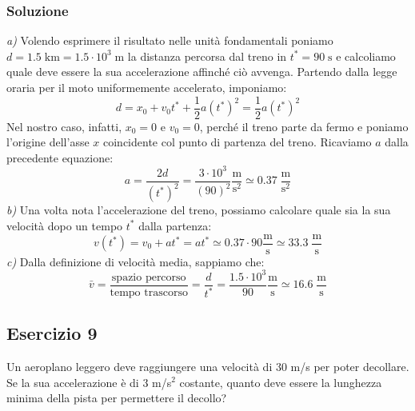 \documentclass[12pt,a4paper]{book}
\begin{document}
\subsubsection*{Soluzione}
\emph{a)} Volendo esprimere il risultato nelle unità fondamentali poniamo $d=1.5 \; \text{km} = 1.5 \cdot 10^3 \; \text{m}$ la distanza percorsa dal treno in $t^*=90 \; \text{s}$ e calcoliamo quale deve essere la sua accelerazione affinché ciò avvenga. Partendo dalla legge oraria per il moto uniformemente accelerato, imponiamo:\\
\begin{equation*}
d=x_0+v_0 t^* + \frac{1}{2}a (t^*)^2 = \frac{1}{2} a (t^*)^2
\end{equation*}
Nel nostro caso, infatti, $x_0 =0$ e $v_0 = 0$, perché il treno parte da fermo e poniamo l'origine dell'asse $x$ coincidente col punto di partenza del treno. Ricaviamo $a$ dalla precedente equazione:\\
\begin{equation*}
a= \frac{2d}{(t^*)^2}= \frac{3 \cdot 10^3}{(90)^2} \frac{\text{m}}{\text{s}^2}\simeq 0.37 \; \frac{\text{m}}{\text{s}^2}
\end{equation*}
\emph{b)} Una volta nota l'accelerazione del treno, possiamo calcolare quale sia la sua velocità dopo un tempo $t^*$ dalla partenza:\\
\begin{equation*}
v(t^*) = v_0 + a t^* = a t^* \simeq 0.37\cdot 90 \frac{\text{m}}{\text{s}} \simeq 33.3 \; \frac{\text{m}}{\text{s}}
\end{equation*}
\emph{c)} Dalla definizione di velocità media, sappiamo che:\\
\begin{equation*}
\bar{v}= \frac{\text{spazio  percorso}}{\text{tempo  trascorso}}=\frac{d}{t^*}=\frac{1.5 \cdot 10^3}{90}\frac{\text{m}}{\text{s}}\simeq16.6\; \frac{\text{m}}{\text{s}}
\end{equation*}

\subsection*{Esercizio 9}
Un aeroplano leggero deve raggiungere una velocità di 30 m/s per poter decollare. Se la sua accelerazione è di $3 $ m/s$^2$ costante, quanto deve essere la lunghezza minima della pista per permettere il decollo?
\end{document}
